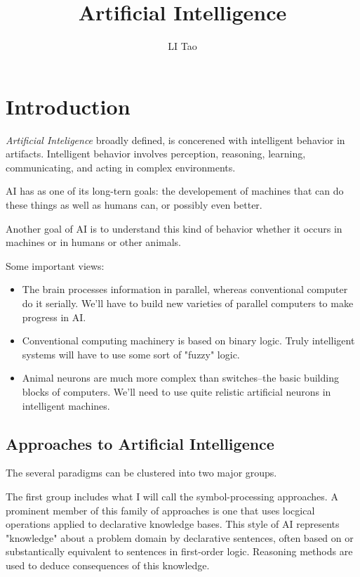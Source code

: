 \usepackage{parskip}
\usepackage{amsthm}
\usepackage{amsmath}
\usepackage{amsfonts}
\topmargin -1.5cm
\oddsidemargin -0.04cm
\evensidemargin -0.04cm
\textwidth 16.59cm
\textheight 25cm
\newtheorem{theorem}{Theorem}[chapter]
\newtheorem{lemma}[theorem]{Lemma}
\newtheorem{proposition}[theorem]{Proposition}
\newtheorem{corollary}[theorem]{Corollary}

\author{LI Tao}
\title{Artificial Intelligence}

\chapter{Introduction}
\emph{Artificial Inteligence} broadly defined, is concerened with intelligent behavior in artifacts. Intelligent behavior involves perception, reasoning, learning, communicating, and acting in complex environments.

AI has as one of its long-tern goals: the developement of machines that can do these things as well as humans can, or possibly even better.

Another goal of AI is to understand this kind of behavior whether it occurs in machines or in humans or other animals. 

Some important views:
\begin{itemize}
\item The brain processes information in parallel, whereas conventional computer do it serially. We'll have to build new varieties of parallel computers to make progress in AI.
\item Conventional computing machinery is based on binary logic. Truly intelligent systems will have to use some sort of "fuzzy" logic.
\item Animal neurons are much more complex than switches--the basic building blocks of computers. We'll need to use quite relistic artificial neurons in intelligent machines.
\end{itemize}
\section{Approaches to Artificial Intelligence}
The several paradigms can be clustered into two major groups.

The first group includes what I will call the symbol-processing approaches. A prominent member of this family of approaches is one that uses locgical operations applied to declarative knowledge bases. This style of AI represents "knowledge" about a problem domain by declarative sentences, often based on or substantically equivalent to sentences in first-order logic. Reasoning methods are used to deduce consequences of this knowledge.

